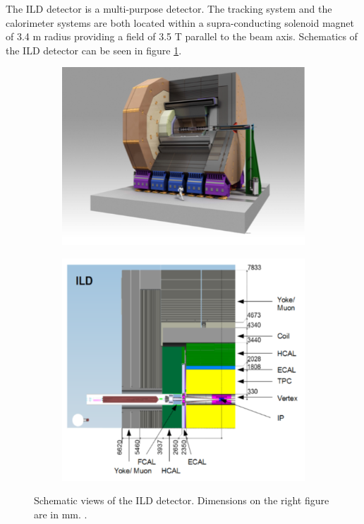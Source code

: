 The ILD detector is a multi-purpose detector. The tracking system and the calorimeter systems are both located within a supra-conducting solenoid magnet of 3.4 m radius providing a field of 3.5 T parallel to the beam axis. Schematics of the ILD detector can be seen in figure \ref{fig:ILD}.

\begin{figure}[htbp!]
  \centering
  \begin{subfigure}[t]{0.49\textwidth}
    \includegraphics[width=1.\linewidth]{chap2/fig/ILD_full.png}
  \end{subfigure}
  \hfill
  \begin{subfigure}[t]{0.49\textwidth}
    \includegraphics[width=1.\linewidth]{chap2/fig/ILD_layout.png}
  \end{subfigure}
  \caption{Schematic views of the ILD detector. Dimensions on the right figure are in mm. \cite{ILC_TDR_Vol4}.} \label{fig:ILD}
\end{figure}

